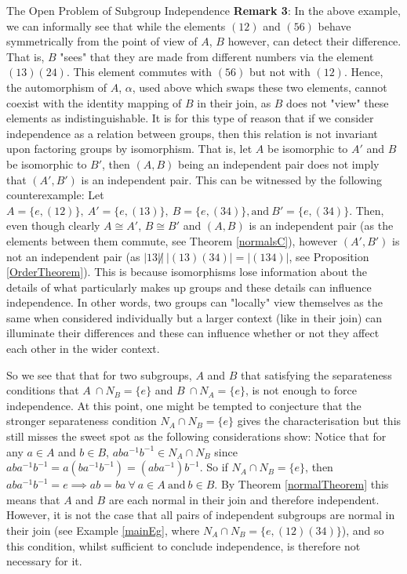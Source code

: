 \documentclass{article}
\begin{document}
\begin{section}{The Open Problem of Subgroup Independence}
		\noindent \textbf{Remark 3}: In the above example, we can informally see that while the elements $(12)$ and $(56)$ behave symmetrically from the point of view of $A$, $B$ however, can detect their difference. That is, $B$ "sees" that they are made from different numbers via the element $(13)(24)$. This element commutes with $(56)$ but not with $(12)$. Hence, the automorphism of $A$, $\alpha$, used above which swaps these two elements, cannot coexist with the identity mapping of $B$ in their join, as $B$ does not "view" these elements as indistinguishable. It is for this type of reason that if we consider independence as a relation between groups, then this relation is not invariant upon factoring groups by isomorphism. That is, let $A$ be isomorphic to $A'$ and $B$ be isomorphic to $B'$, then $(A, B)$ being an independent pair does not imply that $(A', B')$ is an independent pair. This can be witnessed by the following counterexample: Let $A = \{e, (12)\}, \ A' = \{e, (13)\}, \ B = \{e, (34) \}, \text{and} \ B'= \{ e, (34)\}$. Then, even though clearly $A \cong A'$, $B \cong B'$ and $(A, B)$ is an independent pair (as the elements between them commute, see Theorem \ref{normalsC}), however $(A', B')$ is not an independent pair (as $|13| \not| \ |(13)(34)| = |(134)|$, see Proposition \ref{OrderTheorem}). This is because isomorphisms lose information about the details of what particularly makes up groups and these details can influence independence. In other words, two groups can "locally" view themselves as the same when considered individually but a larger context (like in their join) can illuminate their differences and these can influence whether or not they affect each other in the wider context.
		
		So we see that that for two subgroups, $A$ and $B$ that satisfying the separateness conditions that $A \  \cap  N_B = \{e\}$ and $B \ \cap N_A  = \{e\}$, is not enough to force independence. At this point, one might be tempted to conjecture that the stronger separateness condition $N_A  \cap  N_B = \{e\} $ gives the characterisation but this still misses the sweet spot as the following considerations show:   Notice that for any $a \in A$ and $b \in B$, $aba^{-1}b^{-1} \in N_A  \cap  N_B $ since $aba^{-1}b^{-1}  = a(ba^{-1}b^{-1}) = (aba^{-1})b^{-1}$. So if  $N_A  \cap  N_B  = \{e\}$, then $ aba^{-1}b^{-1}  = e \implies ab = ba \ \forall \ a \in A \ \text{and} \ b \in B$. By Theorem \ref{normalTheorem} this means that $A$ and $B$ are each normal in their join and therefore independent. However, it is  not the case that  all pairs of independent subgroups are  normal in their join (see Example \ref{mainEg}, where $N_A  \cap  N_B  = \{e, (12)(34)\}$), and so this condition, whilst sufficient to conclude independence, is therefore not necessary for it. 
		

\end{section}
\end{document}
